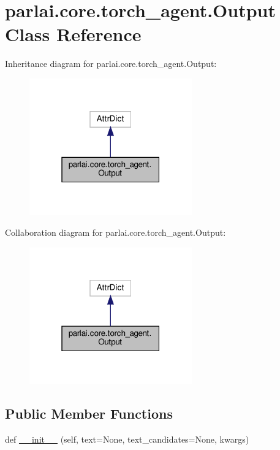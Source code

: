 \hypertarget{classparlai_1_1core_1_1torch__agent_1_1Output}{}\section{parlai.\+core.\+torch\+\_\+agent.\+Output Class Reference}
\label{classparlai_1_1core_1_1torch__agent_1_1Output}


Inheritance diagram for parlai.\+core.\+torch\+\_\+agent.\+Output\+:
\nopagebreak
\begin{figure}[H]
\begin{center}
\leavevmode
\includegraphics[width=199pt]{classparlai_1_1core_1_1torch__agent_1_1Output__inherit__graph}
\end{center}
\end{figure}


Collaboration diagram for parlai.\+core.\+torch\+\_\+agent.\+Output\+:
\nopagebreak
\begin{figure}[H]
\begin{center}
\leavevmode
\includegraphics[width=199pt]{classparlai_1_1core_1_1torch__agent_1_1Output__coll__graph}
\end{center}
\end{figure}
\subsection*{Public Member Functions}
\begin{DoxyCompactItemize}
\item 
def \hyperlink{classparlai_1_1core_1_1torch__agent_1_1Output_a490f5e29040c643f20b63c23e7359627}{\+\_\+\+\_\+init\+\_\+\+\_\+} (self, text=None, text\+\_\+candidates=None, kwargs)
\end{DoxyCompactItemize}


